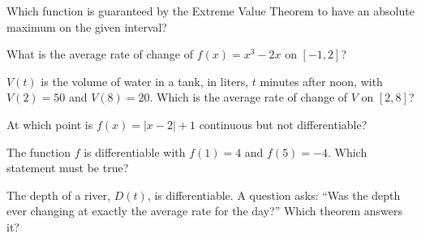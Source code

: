\documentclass[11pt]{article}
\begin{document}
\begin{exo}[1-5]{}
Which function is guaranteed by the Extreme Value Theorem to have an absolute maximum on the given interval?
\choices{$f(x)=x^2-3x$ on $[0,4]$}{$f(x)=\dfrac1x$ on $(0,1]$}{$f(x)=x$ on $(0,2)$}{$f(x)=\dfrac{1}{x-1}$ on $[0,2]$}
\end{exo}
\begin{exo}[1-6]{}
What is the average rate of change of $f(x)=x^3-2x$ on $[-1,2]$?
\end{exo}
\begin{exo}[1-6]{}
$V(t)$ is the volume of water in a tank, in liters, $t$ minutes after noon, with $V(2)=50$ and $V(8)=20$. Which is the average rate of change of $V$ on $[2,8]$?
\end{exo}
\begin{exo}[1-7]{}
At which point is $f(x)=|x-2|+1$ continuous but not differentiable?
\end{exo}
\begin{exo}[1-8]{}
The function $f$ is differentiable with $f(1)=4$ and $f(5)=-4$. Which statement must be true?
\end{exo}
\begin{exo}[1-9]{}
The depth of a river, $D(t)$, is differentiable. A question asks: ``Was the depth ever changing at exactly the average rate for the day?'' Which theorem answers it?
\end{exo}
\end{document}
